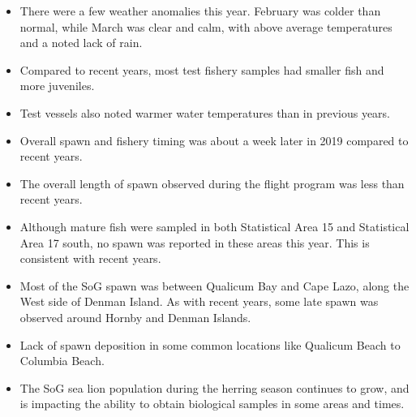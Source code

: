 \begin{itemize}
\item There were a few weather anomalies this year.
February was colder than normal, while March was clear and calm, with above average temperatures and a noted lack of rain.
\item Compared to recent years, most test fishery samples had smaller fish and more juveniles.
\item Test vessels also noted warmer water temperatures than in previous years. 
\item Overall spawn and fishery timing was about a week later in 2019 compared to recent years.
\item The overall length of spawn observed during the flight program was less than recent years.
\item Although mature fish were sampled in both Statistical Area 15 and Statistical Area 17 south, no spawn was reported in these areas this year.
This is consistent with recent years.
\item Most of the SoG spawn was between Qualicum Bay and Cape Lazo, along the West side of Denman Island.
As with recent years, some late spawn was observed around Hornby and Denman Islands.
\item Lack of spawn deposition in some common locations like Qualicum Beach to Columbia Beach.
\item The SoG sea lion population during the herring season continues to grow, and is impacting the ability to obtain biological samples in some areas and times.
\end{itemize}